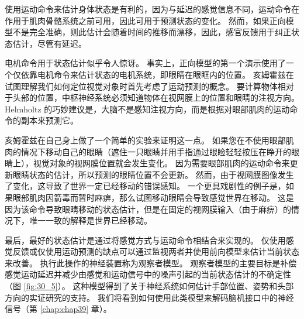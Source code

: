 使用运动命令来估计身体状态是有利的，因为与延迟的感觉信息不同，运动命令在作用于肌肉骨骼系统之前可用，因此可用于预测状态的变化。 然而，如果正向模型不是完全准确，则此估计会随着时间的推移而漂移，因此，感官反馈用于纠正状态估计，尽管有延迟。

电机命令用于状态估计似乎令人惊讶。 事实上，正向模型的第一个演示使用了一个仅依靠电机命令来估计状态的电机系统，即眼睛在眼眶内的位置。 亥姆霍兹在试图理解我们如何定位视觉对象时首先考虑了运动预测的概念。 要计算物体相对于头部的位置，中枢神经系统必须知道物体在视网膜上的位置和眼睛的注视方向。 Helmholtz 的巧妙建议是，大脑不是感知注视方向，而是根据对眼部肌肉的运动命令的副本来预测它。

亥姆霍兹在自己身上做了一个简单的实验来证明这一点。 如果您在不使用眼部肌肉的情况下移动自己的眼睛（遮住一只眼睛并用手指通过眼睑轻轻按压在睁开的眼睛上），视觉对象的视网膜位置就会发生变化。 因为需要眼部肌肉的运动命令来更新眼睛状态的估计，所以预测的眼睛位置不会更新。 然而，由于视网膜图像发生了变化，这导致了世界一定已经移动的错误感知。 一个更具戏剧性的例子是，如果眼部肌肉因箭毒而暂时麻痹，那么试图移动眼睛会导致感觉世界在移动。 这是因为该命令导致眼睛移动的状态估计，但是在固定的视网膜输入（由于麻痹）的情况下，唯一一致的解释是世界已经移动。

最后，最好的状态估计是通过将感觉方式与运动命令相结合来实现的。 仅使用感觉反馈或仅使用运动预测的缺点可以通过监视两者并使用前向模型来估计当前状态来改善。 执行此操作的神经装置称为观察者模型。 
观察者模型的主要目标是补偿感觉运动延迟并减少由感觉和运动信号中的噪声引起的当前状态估计的不确定性（图 \ref{fig:30_5}）。 
这种模型得到了关于神经系统如何估计手部位置、姿势和头部方向的实证研究的支持。 我们将看到如何使用此类模型来解码脑机接口中的神经信号（第 \ref{chap:chap39} 章）。

